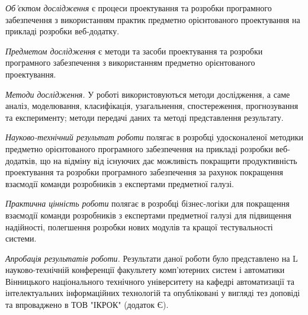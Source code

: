 \emph{Об'єктом дослідження} є процеси проектування та розробки
програмного забезпечення з використанням практик 
предметно орієнтованого проектування на прикладі розробки веб-додатку.

\emph{Предметом дослідження} є методи та засоби проектування та
розробки програмного забезпечення з використанням предметно орієнтованого проектування.

\emph{Методи дослідження.} У роботі використовуються методи дослідження, а
саме аналіз, моделювання, класифікація, узагальнення, спостереження,
прогнозування та експерименту; методи передачі даних та методі
представлення результату.

\emph{Науково-технічний результат роботи} полягає в розробці удосконаленої
методики предметно орієнтованого програмного забезпечення на прикладі
розробки веб-додатків, що на відміну від існуючих дає можливість
покращити продуктивність проектування та розробки програмного 
забезпечення за рахунок покращення взаємодії команди розробників
з експертами предметної галузі. 

\emph{Практична цінність роботи} полягає в розробці бізнес-логіки
для покращення взаємодії команди розробників з експертами
предметної галузі для підвищення надійності, полегшення розробки
нових модулів та кращої тестувальності системи.

\emph{Апробація результатів роботи.} Результати даної роботи було
представлено на L науково-технічній конференції
факультету комп’ютерних систем і автоматики 
Вінницького національного технічного університету на
кафедрі автоматизації та інтелектуальних інформаційних технологій
та опубліковані у вигляді тез доповіді \cite{thesis} та впроваджено в ТОВ "ІКРОК" (додаток Є).

